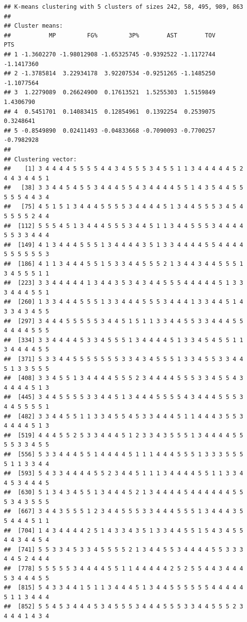 \documentclass[
]{book}
\begin{document}
\begin{verbatim}
## K-means clustering with 5 clusters of sizes 242, 58, 495, 989, 863
## 
## Cluster means:
##           MP         FG%         3P%        AST        TOV        PTS
## 1 -1.3602270 -1.98012908 -1.65325745 -0.9392522 -1.1172744 -1.1417360
## 2 -1.3785814  3.22934178  3.92207534 -0.9251265 -1.1485250 -1.1077564
## 3  1.2279089  0.26624900  0.17613521  1.5255303  1.5159849  1.4306790
## 4  0.5451701  0.14083415  0.12854961  0.1392254  0.2539075  0.3248641
## 5 -0.8549890  0.02411493 -0.04833668 -0.7090093 -0.7700257 -0.7982928
## 
## Clustering vector:
##    [1] 3 4 4 4 4 5 5 5 5 4 4 3 4 5 5 5 3 4 5 5 1 1 3 4 4 4 4 4 5 2 4 4 3 4 4 5 1
##   [38] 3 3 4 4 5 4 5 5 3 4 4 4 5 5 4 3 4 4 4 4 5 5 1 4 3 5 4 4 5 5 5 5 5 4 4 3 4
##   [75] 4 5 1 5 1 3 4 4 4 5 5 5 5 3 4 4 4 4 5 1 3 4 4 5 5 5 3 4 5 4 5 5 5 5 2 4 4
##  [112] 5 5 5 4 5 1 3 4 4 4 5 5 5 3 4 4 5 1 1 3 4 4 5 5 5 3 4 4 4 4 5 5 3 3 4 4 4
##  [149] 4 1 3 4 4 4 5 5 5 1 3 4 4 4 4 3 5 1 3 3 4 4 4 4 5 5 4 4 4 4 5 5 5 5 5 5 3
##  [186] 4 1 1 3 4 4 4 5 5 1 5 3 3 4 4 5 5 5 2 1 3 4 4 3 4 4 5 5 5 1 3 4 5 5 5 1 1
##  [223] 3 3 4 4 4 4 4 1 3 4 4 3 5 3 4 3 4 4 5 5 5 4 4 4 4 4 5 1 3 3 3 4 4 4 5 5 1
##  [260] 1 3 3 4 4 4 5 5 5 1 3 3 4 4 4 5 5 5 3 4 4 4 1 3 3 4 4 5 1 4 3 3 4 3 4 5 5
##  [297] 3 4 4 4 5 5 5 5 5 3 4 4 5 1 5 1 1 3 3 4 4 5 5 3 3 4 4 4 5 5 4 4 4 4 5 5 5
##  [334] 3 3 4 4 4 4 5 3 3 4 5 5 5 1 3 4 4 4 4 5 1 3 3 4 5 4 5 5 1 1 3 4 4 4 4 5 5
##  [371] 5 3 3 4 4 5 5 5 5 5 5 5 3 3 4 3 4 5 5 5 1 3 3 4 5 5 3 3 4 4 5 1 3 3 5 5 5
##  [408] 3 3 4 5 5 1 3 4 4 4 4 5 5 5 2 3 4 4 4 4 5 5 5 3 3 4 5 5 4 3 4 4 4 4 5 1 3
##  [445] 3 4 4 5 5 5 5 3 3 4 4 5 1 3 4 4 4 5 5 5 5 4 3 4 4 4 5 5 5 3 4 4 5 5 5 5 1
##  [482] 3 3 4 4 5 5 1 1 3 3 4 5 5 4 5 3 3 4 4 4 5 1 1 4 4 4 3 5 5 3 4 4 4 4 5 1 3
##  [519] 4 4 4 5 5 2 5 3 3 4 4 4 5 1 2 3 3 4 3 5 5 5 1 3 4 4 4 4 5 5 5 5 3 3 4 5 5
##  [556] 5 3 3 4 4 4 5 5 1 4 4 4 4 5 1 1 1 4 4 4 5 5 5 1 3 3 3 5 5 5 5 1 1 3 3 4 4
##  [593] 5 4 3 3 4 4 4 4 5 5 2 3 4 4 5 1 1 1 3 4 4 4 4 5 5 1 1 3 3 4 4 5 3 4 4 4 5
##  [630] 5 1 3 4 3 4 5 5 1 3 4 4 4 5 2 1 3 4 4 4 4 5 4 4 4 4 4 4 5 5 5 3 4 3 5 5 5
##  [667] 3 4 4 3 5 5 5 1 2 3 4 4 5 5 5 3 3 4 4 4 5 5 5 1 3 4 4 4 3 5 5 4 4 4 5 1 1
##  [704] 1 4 3 4 4 4 4 2 5 1 4 3 3 4 3 5 1 3 3 4 4 5 5 1 5 4 3 4 5 5 4 4 3 4 4 5 4
##  [741] 5 5 3 3 4 5 3 3 4 5 5 5 5 2 1 3 4 4 5 5 3 4 4 4 4 5 5 3 3 3 4 4 5 2 4 4 4
##  [778] 5 5 5 5 5 3 4 4 4 4 5 5 1 1 4 4 4 4 4 2 5 2 5 5 4 4 3 4 4 4 5 3 4 4 4 5 5
##  [815] 5 4 3 3 4 4 1 5 1 1 3 4 4 4 5 1 3 4 4 5 5 5 5 5 5 4 4 4 4 4 5 1 1 3 4 4 4
##  [852] 5 5 4 5 3 4 4 4 5 3 4 5 5 5 3 4 4 4 5 5 5 3 3 4 4 5 5 5 2 3 4 4 4 1 4 3 4

\end{verbatim}
\end{document}
